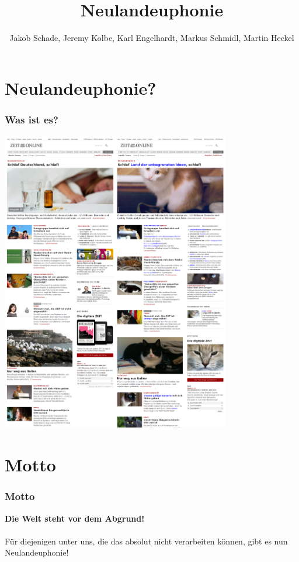 \documentclass [xcolor=dvipsnames] {beamer}
\title {\sc Neulandeuphonie}
\author {Jakob Schade, Jeremy Kolbe, Karl Engelhardt, Markus Schmidl, Martin Heckel}
\begin{document}
\begin{frame}
	\titlepage
\end{frame}


\section{Neulandeuphonie?}
\begin{frame}
	\frametitle{\sc Was ist es?}
	\begin{center}
		\includegraphics[width=10cm] {combined}
	\end{center}
\end{frame}

\section{Motto}
\begin{frame}
	\frametitle{\sc Motto}
	\begin{center}
		{\bf Die Welt steht vor dem Abgrund!}\\ \ \\ Für diejenigen unter uns, die das absolut nicht verarbeiten können, gibt es nun Neulandeuphonie!
	\end{center}
\end{frame}
\end{document}
